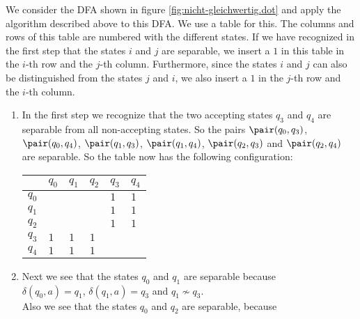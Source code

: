 \exerciseEng
We consider the  \textsc{DFA} shown in figure \ref{fig:nicht-gleichwertig.dot} and apply the algorithm
described above to this \textsc{DFA}. 
We use a table for this.  The columns and rows of this table are numbered with the different states.  If we
have recognized in the first step that the states $i$ and $j$ are separable, we insert a $1$ in this
table in the $i$-th row and the $j$-th column. 
Furthermore, since the states $i$ and $j$ can also be distinguished from the states $j$ and $i$, we also insert
a $1$ in the $j$-th row and the $i$-th column. 
\begin{enumerate}
\item In the first step we recognize that the two accepting states $q_3$ and $q_4$ are separable from all non-accepting states.
      So the pairs 
      $\pair(q_0,q_3)$,
      $\pair(q_0,q_4)$,
      $\pair(q_1,q_3)$,
      $\pair(q_1,q_4)$,
      $\pair(q_2,q_3)$ and
      $\pair(q_2,q_4)$
      are separable. So the table now has the following configuration:
      \begin{center}        
      \begin{tabular}[t]{|l||l|l|l|l|l|}
      \hline
            & $q_0$    &    $q_1$ &    $q_2$ &      $q_3$ &      $q_4$  \\
      \hline
      \hline
      $q_0$ &          &          &          & $1$ & $1$  \\
      \hline
      $q_1$ &          &          &          &$1$ &$1$  \\
      \hline
      $q_2$ &          &          &          &$1$ &$1$  \\
      \hline
      $q_3$ &$1$        &$1$         &       $1$ &          &           \\
      \hline
      $q_4$ &$1$ &$1$ &$1$ &          &           \\
      \hline
      \end{tabular}
      \end{center}
\item Next we see that the states $q_0$ and $q_1$ are separable because
      \\[0.2cm]
      \hspace*{1.3cm}
      $\delta(q_0,a) = q_1$, \quad $\delta(q_1,a) = q_3$ \quad and \quad $q_1 \not\sim q_3$.
      \\[0.2cm]
      Also we see that the states $q_0$ and $q_2$ are separable, because
      \\[0.2cm]
      \hspace*{1.3cm}

\end{enumerate}

